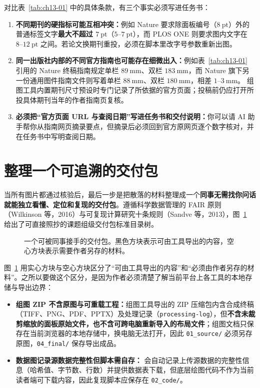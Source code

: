 对比表~\ref{tab:ch13-01} 中的具体条款，有三个事实必须写进任务书：
\begin{enumerate}
\item \textbf{不同期刊的硬指标可能互相冲突：}例如 Nature 要求除面板编号（$8\ \text{pt}$）外的普通标签文字\textbf{最大不超过 $7\ \text{pt}$}（$5\text{--}7\ \text{pt}$），而 PLOS ONE 则要求图内文字在 \textbf{$8\text{--}12\ \text{pt}$} 之间。若论文换期刊重投，必须在脚本里改字号参数重新出图。
\item \textbf{同一出版社内部的不同官方指南也可能存在细微出入：}例如表~\ref{tab:ch13-01} 引用的 Nature 终稿指南规定单栏 $89\ \text{mm}$、双栏 $183\ \text{mm}$，而 Nature 旗下另一份通用图件指南文件则写着单栏 $88\ \text{mm}$、双栏 $180\ \text{mm}$，相差 $1\text{--}3\ \text{mm}$。\scidraw{} 组图工具内置期刊尺寸预设时专门记录了所依据的官方页面；投稿前仍应打开所投具体期刊当年的作者指南页复核。
\item \textbf{必须把“官方页面 URL 与查阅日期”写进任务书和交付说明：}你可以请 AI 助手帮你从指南网页摘录要点，但摘录后必须回到官方原网页逐个数字核对，并在任务书中写明查阅日期。
\end{enumerate}

\section{整理一个可追溯的交付包}

当所有图片都通过核验后，最后一步是把散落的材料整理成一个\textbf{同事无需找你问话就能独立看懂、定位和复现的交付包}。遵循科学数据管理的 FAIR 原则（Wilkinson 等，2016）与可复现计算研究十条规则（Sandve 等，2013），图~\ref{fig:ch13-08} 给出了可直接照抄的课题组级交付包标准目录树。

\begin{figure}[htbp]\centering
{\let\tag\undefined\makeatletter{}\makeatother}
\caption{一个可被同事接手的交付包。黑色方块表示可由工具导出的内容，空心方块表示需要作者另存的材料。}\label{fig:ch13-08}
\end{figure}

图~\ref{fig:ch13-08} 用实心方块与空心方块区分了“可由工具导出的内容”和“必须由作者另存的材料”。之所以要做这个区分，是因为作者必须清楚了解当前平台上各工具的本地存储与导出边界：
\begin{itemize}
\item \textbf{组图 ZIP 不含原图与可重载工程：}组图工具导出的 ZIP 压缩包内含合成终稿（TIFF、PNG、PDF、PPTX）及处理记录（\texttt{processing-log}），但\textbf{不含未裁剪缩放的面板原始文件，也不含可跨电脑重新导入的布局文件}；组图文档只保存在当前浏览器的本地存储中，换电脑无法打开，因此 \texttt{01\_source/} 必须另存原图，\texttt{04\_final/} 保存导出成品。
\item \textbf{数据图记录源数据完整性但脚本需自存：} 会自动记录上传源数据的完整性信息（哈希值、字节数、行数）并提供数据表下载，但底层绘图代码不作为当前读者端可下载内容，因此复现脚本应保存在 \texttt{02\_code/}。
\end{itemize}

